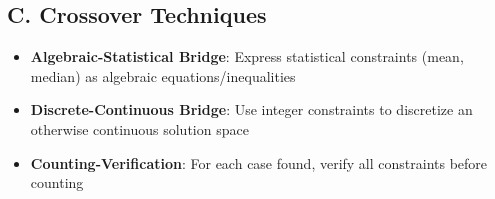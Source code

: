 \documentclass[11pt]{article}
\begin{document}
\begin{tacticalbox}
\subsection*{C. Crossover Techniques}
\begin{itemize}[leftmargin=*]
    \item \textbf{Algebraic-Statistical Bridge}: Express statistical constraints (mean, median) as algebraic equations/inequalities
    
    \item \textbf{Discrete-Continuous Bridge}: Use integer constraints to discretize an otherwise continuous solution space
    
    \item \textbf{Counting-Verification}: For each case found, verify all constraints before counting
\end{itemize}
\end{tacticalbox}
\end{document}
